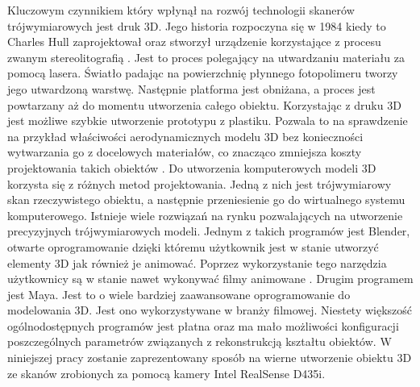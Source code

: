 
Kluczowym czynnikiem który wpłynął na rozwój technologii skanerów trójwymiarowych jest druk 3D. Jego historia rozpoczyna się w 1984 kiedy to Charles Hull zaprojektował oraz stworzył urządzenie korzystające z procesu zwanym stereolitografią \cite{gokhare2017review}. Jest to proces polegający na utwardzaniu materiału za pomocą lasera. Światło padając na powierzchnię płynnego fotopolimeru tworzy jego utwardzoną warstwę. Następnie platforma jest obniżana, a proces jest powtarzany aż do momentu utworzenia całego obiektu. Korzystając z druku 3D jest możliwe szybkie utworzenie prototypu z plastiku. Pozwala to na sprawdzenie na przykład właściwości aerodynamicznych modelu 3D bez konieczności wytwarzania go z docelowych materiałów, co znacząco zmniejsza koszty projektowania takich obiektów \cite{bassett20153d}. Do utworzenia komputerowych modeli 3D korzysta się z różnych metod projektowania. Jedną z nich jest trójwymiarowy skan rzeczywistego obiektu, a następnie przeniesienie go do wirtualnego systemu komputerowego. Istnieje wiele rozwiązań na rynku pozwalających na utworzenie precyzyjnych trójwymiarowych modeli. Jednym z takich programów jest Blender, otwarte oprogramowanie dzięki któremu użytkownik jest w stanie utworzyć elementy 3D jak również je animować. Poprzez wykorzystanie tego narzędzia użytkownicy są w stanie nawet wykonywać filmy animowane \cite{BlenderMovies}. Drugim programem jest Maya. Jest to o wiele bardziej zaawansowane oprogramowanie do modelowania 3D. Jest ono wykorzystywane w branży filmowej. Niestety większość ogólnodostępnych programów jest płatna oraz ma mało możliwości konfiguracji poszczególnych parametrów związanych z rekonstrukcją kształtu obiektów. W niniejszej pracy zostanie zaprezentowany sposób na wierne utworzenie obiektu 3D ze skanów zrobionych za pomocą kamery Intel RealSense D435i.